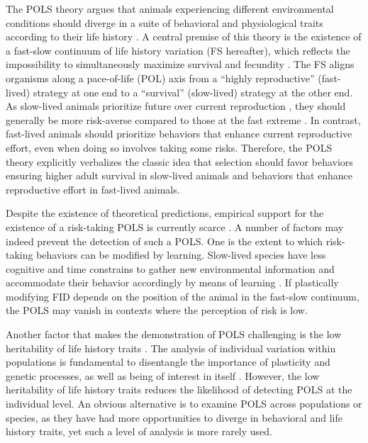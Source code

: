 The POLS theory argues that animals experiencing different
environmental conditions should diverge in a suite of behavioral
and physiological traits according to their life history 
\citep{Ricklefs2002, Tieleman2005, Hau2010a, Reale2010a}. 
A central premise of this theory is the existence of a
fast-slow continuum of life history variation (FS hereafter),
which reflects the impossibility to simultaneously maximize survival
and fecundity \citep{Stearns1983a, Saether1988}. The FS aligns
organisms along a pace-of-life (POL) axis from a ``highly
reproductive'' (fast-lived) strategy at one end to a ``survival''
(slow-lived) strategy at the other end. As slow-lived animals
prioritize future over current reproduction \cite{Stearns2000}, they
should generally be more risk-averse compared to those at the
fast extreme \citep{Martin2000, Wolf2007, Hau2010a, Moller2012, Moller2013a}.
In contrast, fast-lived animals should prioritize behaviors that
enhance current reproductive effort, even when doing so involves
taking some risks. Therefore, the POLS theory explicitly verbalizes
the classic idea that selection should favor behaviors ensuring
higher adult survival in slow-lived animals and behaviors that
enhance reproductive effort in fast-lived animals.

Despite the existence of theoretical predictions, empirical
support for the existence of a risk-taking POLS is currently
scarce \citep{Hille2015, Charmantier2017}. A %
number of factors may indeed prevent the detection of such a
POLS. One is the extent to which risk-taking behaviors can be
modified by learning. Slow-lived species have less cognitive
and time constrains to gather new environmental information
and accommodate their behavior accordingly by means of
learning \citep{VanSchaik2003, Sol2009a, Sih2012, Sol2016a}.
If plastically modifying FID
depends on the position of the animal in the fast-slow continuum,
the POLS may vanish in contexts where the perception
of risk is low.

Another factor that makes the demonstration of POLS challenging
is the low heritability of life history traits \citep{Price1991}.
The analysis of individual variation within
populations is fundamental to disentangle the importance of
plasticity and genetic processes, as well as being of interest in
itself \citep{Reale2007}. However, the low heritability of life
history traits reduces the likelihood of detecting POLS at the
individual level. An obvious alternative is to examine POLS
across populations or species, as they have had more opportunities
to diverge in behavioral and life history traits, yet such
a level of analysis is more rarely used.

